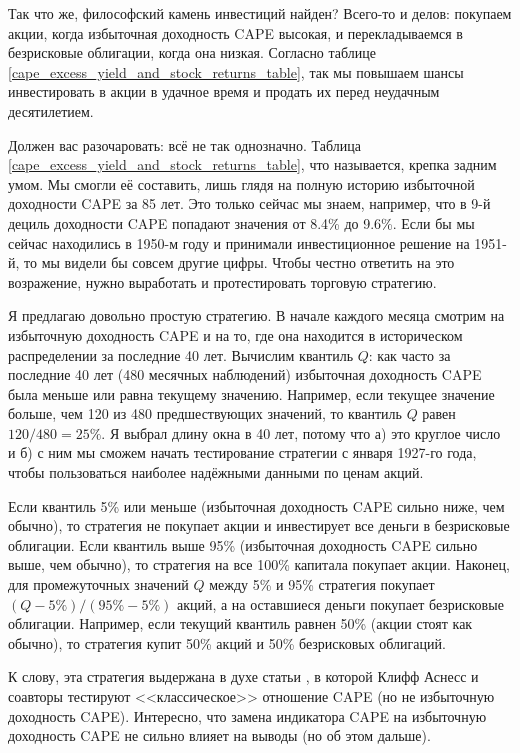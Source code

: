 Так что же, философский камень инвестиций найден? Всего-то и делов: покупаем акции, когда избыточная доходность CAPE высокая, и перекладываемся в безрисковые облигации, когда она низкая. Согласно таблице \ref{cape_excess_yield_and_stock_returns_table}, так мы повышаем шансы инвестировать в акции в удачное время и продать их перед неудачным десятилетием.

Должен вас разочаровать: всё не так однозначно. Таблица \ref{cape_excess_yield_and_stock_returns_table}, что называется, крепка задним умом. Мы смогли её составить, лишь глядя на полную историю избыточной доходности CAPE за 85 лет. Это только сейчас мы знаем, например, что в 9-й дециль доходности CAPE попадают значения от 8.4\% до 9.6\%. Если бы мы сейчас находились в 1950-м году и принимали инвестиционное решение на 1951-й, то мы видели бы совсем другие цифры. Чтобы честно ответить на это возражение, нужно выработать и протестировать торговую стратегию.

Я предлагаю довольно простую стратегию. В начале каждого месяца смотрим на избыточную доходность CAPE и на то, где она находится в историческом распределении за последние 40 лет. Вычислим квантиль $Q$: как часто за последние 40 лет (480 месячных наблюдений) избыточная доходность CAPE была меньше или равна текущему значению. Например, если текущее значение больше, чем 120 из 480 предшествующих значений, то квантиль $Q$ равен $120/480 = 25\%$. Я выбрал длину окна в 40 лет, потому что а) это круглое число и б) с ним мы сможем начать тестирование стратегии с января 1927-го года, чтобы пользоваться наиболее надёжными данными по ценам акций.

Если квантиль 5\% или меньше (избыточная доходность CAPE сильно ниже, чем обычно), то стратегия не покупает акции и инвестирует все деньги в безрисковые облигации. Если квантиль выше 95\% (избыточная доходность CAPE сильно выше, чем обычно), то стратегия на все 100\% капитала покупает акции. Наконец, для промежуточных значений $Q$ между 5\% и 95\% стратегия покупает $(Q - 5\%) / (95\% - 5\%)$ акций, а на оставшиеся деньги покупает безрисковые облигации. Например, если текущий квантиль равнен 50\% (акции стоят как обычно), то стратегия купит 50\% акций и 50\% безрисковых облигаций.

К слову, эта стратегия выдержана в духе статьи \cite{asness2017market}, в которой Клифф Аснесс и соавторы тестируют <<классическое>> отношение CAPE (но не избыточную доходность CAPE). Интересно, что замена индикатора CAPE на избыточную доходность CAPE не сильно влияет на выводы (но об этом дальше).

